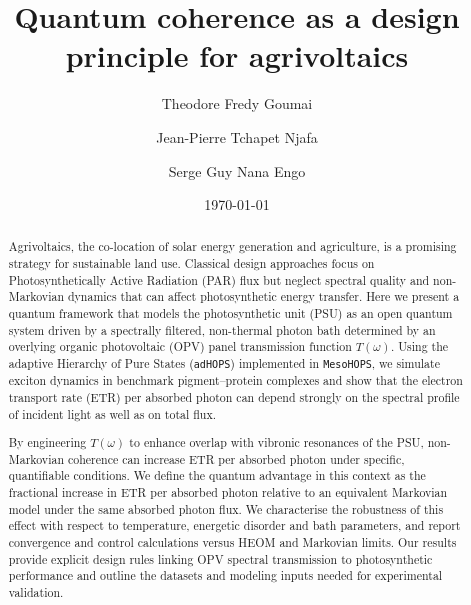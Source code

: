\documentclass[aps,prb,onecolumn,superscriptaddress,notitlepage,nofootinbib,longbibliography,10pt]{revtex4-2}
\date{\today}
\begin{document}
\title[Quantum coherence as a design principle for agrivoltaics]{Quantum coherence as a design principle for agrivoltaics}



\author{Theodore Fredy Goumai}

\author{Jean-Pierre Tchapet Njafa}

\author{Serge Guy Nana Engo}

\begin{abstract}
Agrivoltaics, the co-location of solar energy generation and agriculture, is a promising strategy for sustainable land use. Classical design approaches focus on Photosynthetically Active Radiation (PAR) flux but neglect spectral quality and non-Markovian dynamics that can affect photosynthetic energy transfer. Here we present a quantum framework that models the photosynthetic unit (PSU) as an open quantum system driven by a spectrally filtered, non-thermal photon bath determined by an overlying organic photovoltaic (OPV) panel transmission function $T(\omega)$. Using the adaptive Hierarchy of Pure States (\texttt{adHOPS}) implemented in \texttt{MesoHOPS}, we simulate exciton dynamics in benchmark pigment–protein complexes and show that the electron transport rate (ETR) per absorbed photon can depend strongly on the spectral profile of incident light as well as on total flux.

By engineering $T(\omega)$ to enhance overlap with vibronic resonances of the PSU, non-Markovian coherence can increase ETR per absorbed photon under specific, quantifiable conditions. We define the quantum advantage in this context as the fractional increase in ETR per absorbed photon relative to an equivalent Markovian model under the same absorbed photon flux. We characterise the robustness of this effect with respect to temperature, energetic disorder and bath parameters, and report convergence and control calculations versus HEOM and Markovian limits. Our results provide explicit design rules linking OPV spectral transmission to photosynthetic performance and outline the datasets and modeling inputs needed for experimental validation.
\end{abstract}
\end{document}
